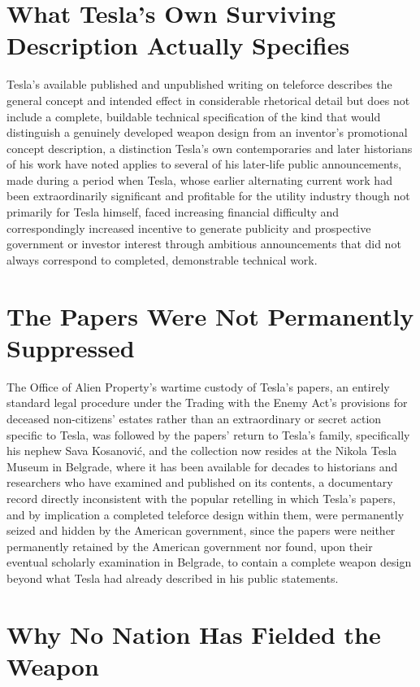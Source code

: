 \documentclass[11pt]{article}
\begin{document}
\section{What Tesla's Own Surviving Description Actually Specifies}

Tesla's available published and unpublished writing on teleforce describes the general concept and intended effect in considerable rhetorical detail but does not include a complete, buildable technical specification of the kind that would distinguish a genuinely developed weapon design from an inventor's promotional concept description, a distinction Tesla's own contemporaries and later historians of his work have noted applies to several of his later-life public announcements, made during a period when Tesla, whose earlier alternating current work had been extraordinarily significant and profitable for the utility industry though not primarily for Tesla himself, faced increasing financial difficulty and correspondingly increased incentive to generate publicity and prospective government or investor interest through ambitious announcements that did not always correspond to completed, demonstrable technical work.

\section{The Papers Were Not Permanently Suppressed}

The Office of Alien Property's wartime custody of Tesla's papers, an entirely standard legal procedure under the Trading with the Enemy Act's provisions for deceased non-citizens' estates rather than an extraordinary or secret action specific to Tesla, was followed by the papers' return to Tesla's family, specifically his nephew Sava Kosanović, and the collection now resides at the Nikola Tesla Museum in Belgrade, where it has been available for decades to historians and researchers who have examined and published on its contents, a documentary record directly inconsistent with the popular retelling in which Tesla's papers, and by implication a completed teleforce design within them, were permanently seized and hidden by the American government, since the papers were neither permanently retained by the American government nor found, upon their eventual scholarly examination in Belgrade, to contain a complete weapon design beyond what Tesla had already described in his public statements.

\section{Why No Nation Has Fielded the Weapon}
\end{document}
